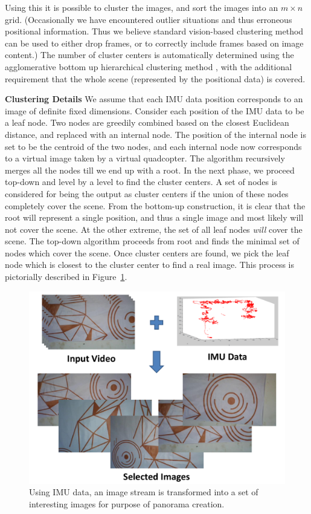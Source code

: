 \documentclass[11pt]{article}
\begin{document}
Using this it is possible to cluster the images, and sort the images
into an $m\times n$ grid.  (Occasionally we have encountered outlier
situations and thus erroneous positional information.  Thus we believe
standard vision-based clustering method can be used to either drop
frames, or to correctly include frames based on image content.)  The
number of cluster centers is automatically determined using the
agglomerative bottom up hierarchical clustering method \cite{Lior}, with the
additional requirement that the whole scene (represented by the
positional data) is covered.  

{\bf Clustering Details} We assume that each IMU data position
corresponds to an image of definite fixed dimensions.  Consider each
position of the IMU data to be a leaf node. Two nodes are greedily
combined based on the closest Euclidean distance, and replaced with an
internal node.  The position of the internal node is set to be the
centroid of the two nodes, and each internal node now corresponds to a
virtual image taken by a virtual quadcopter.  The algorithm
recursively merges all the nodes till we end up with a root.  In the
next phase, we proceed top-down and level by a level to find the
cluster centers.  A set of nodes is considered for being the output as
cluster centers if the union of these nodes completely cover the
scene. From the bottom-up construction, it is clear that the root will
represent a single position, and thus a single image and most likely
will not cover the scene.  At the other extreme, the set of all leaf
nodes \emph{will} cover the scene.  The top-down algorithm proceeds
from root and finds the minimal set of nodes which cover the scene.
Once cluster centers are found, we pick the leaf node which is closest
to the cluster center to find a real image.
This process is pictorially described in
Figure~\ref{fig:selection}.


\begin{figure}[h!]
  \centering
  \includegraphics[width=\textwidth]{mosaicing/figures/selection} 
  \caption{ \label{fig:selection} Using IMU data, an image stream is
    transformed into a set of interesting images for purpose of
    panorama creation. }
\end{figure}    
\end{document}
